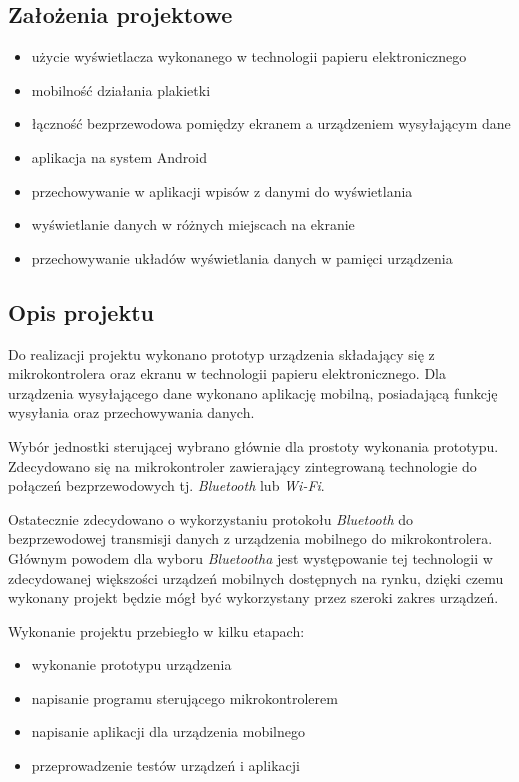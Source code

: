\documentclass[a4paper,12pt, twoside]{article}
\begin{document}
    	\subsection{Założenia projektowe}
    	\begin{itemize}
    		\item użycie wyświetlacza wykonanego w technologii papieru elektronicznego
    		\item mobilność działania plakietki 
    		\item łączność bezprzewodowa pomiędzy ekranem a urządzeniem wysyłającym dane
    		\item aplikacja na system Android
    		\item przechowywanie w aplikacji wpisów z danymi do wyświetlania
    		\item wyświetlanie danych w różnych miejscach na ekranie 
    		\item przechowywanie układów wyświetlania danych w pamięci urządzenia
    	\end{itemize}
    	\newpage
    	
    	\subsection{Opis projektu}
    	Do realizacji projektu wykonano prototyp urządzenia składający się z mikrokontrolera oraz ekranu w technologii papieru elektronicznego. Dla urządzenia wysyłającego dane wykonano aplikację mobilną, posiadającą funkcję wysyłania oraz przechowywania danych. 
    	
    	Wybór jednostki sterującej wybrano głównie dla prostoty wykonania prototypu. Zdecydowano się na mikrokontroler zawierający zintegrowaną technologie do połączeń bezprzewodowych tj. \textit{Bluetooth}\cite{bluetooth} lub \textit{Wi-Fi}\cite{wifi}. 
    	
    	Ostatecznie zdecydowano o wykorzystaniu protokołu \textit{Bluetooth} do bezprzewodowej transmisji danych z urządzenia mobilnego do mikrokontrolera. Głównym powodem dla wyboru \textit{Bluetootha} jest występowanie tej technologii w zdecydowanej większości urządzeń mobilnych dostępnych na rynku, dzięki czemu wykonany projekt będzie mógł być wykorzystany przez szeroki zakres urządzeń.
    	
    	\begin{flushleft}
    	Wykonanie projektu przebiegło w kilku etapach:
    	\begin{itemize}
    	    \item wykonanie prototypu urządzenia
    	    \item napisanie programu sterującego mikrokontrolerem
    	    \item napisanie aplikacji dla urządzenia mobilnego
    	    \item przeprowadzenie testów urządzeń i aplikacji
    	\end{itemize}
    	\end{flushleft}
    	\newpage
\end{document}
